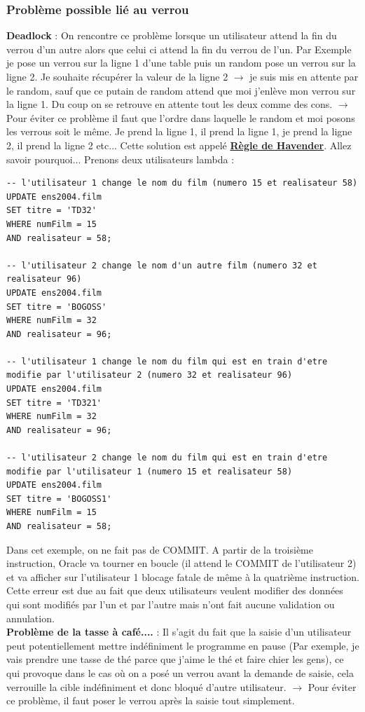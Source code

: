 \documentclass{report}
\begin{document}
\subsubsection{Problème possible lié au verrou}
\textbf{Deadlock} : On rencontre ce problème lorsque un utilisateur attend la fin du verrou d'un autre alors que celui ci attend la fin du verrou de l'un. 
\newline Par Exemple je pose un verrou sur la ligne 1 d'une table puis un random pose un verrou sur la ligne 2. Je souhaite récupérer la valeur de la ligne 2 $\rightarrow$ je suis mis en attente par le random, sauf que ce putain de random attend que moi j'enlève mon verrou sur la ligne 1. Du coup on se retrouve en attente tout les deux comme des cons.
$\rightarrow$ Pour éviter ce problème il faut que l'ordre dans laquelle le random et moi posons les verrous soit le même. Je prend la ligne 1, il prend la ligne 1, je prend la ligne 2, il prend la ligne 2 etc... Cette solution est appelé \textbf{\underline{Règle de Havender}}. Allez savoir pourquoi...
\newline
Prenons deux utilisateurs lambda :
\begin{lstlisting}[style=MySQLStyle]
-- l'utilisateur 1 change le nom du film (numero 15 et realisateur 58)
UPDATE ens2004.film
SET titre = 'TD32'
WHERE numFilm = 15
AND realisateur = 58;

-- l'utilisateur 2 change le nom d'un autre film (numero 32 et realisateur 96)
UPDATE ens2004.film
SET titre = 'BOGOSS'
WHERE numFilm = 32
AND realisateur = 96;

-- l'utilisateur 1 change le nom du film qui est en train d'etre modifie par l'utilisateur 2 (numero 32 et realisateur 96)
UPDATE ens2004.film
SET titre = 'TD321'
WHERE numFilm = 32
AND realisateur = 96;

-- l'utilisateur 2 change le nom du film qui est en train d'etre modifie par l'utilisateur 1 (numero 15 et realisateur 58)
UPDATE ens2004.film
SET titre = 'BOGOSS1'
WHERE numFilm = 15
AND realisateur = 58;
\end{lstlisting}

Dans cet exemple, on ne fait pas de COMMIT. A partir de la troisième instruction, Oracle va tourner en boucle (il attend le COMMIT de l'utilisateur 2) et va afficher sur l'utilisateur 1 blocage fatale de même à la quatrième instruction.
Cette erreur est due au fait que deux utilisateurs veulent modifier des données qui sont modifiés par l'un et par l'autre mais n'ont fait aucune validation ou annulation.\\
\textbf{Problème de la tasse à café....} : Il s'agit du fait que la saisie d'un utilisateur peut potentiellement mettre indéfiniment le programme en pause (Par exemple, je vais prendre une tasse de thé parce que j'aime le thé et faire chier les gens), ce qui provoque dans le cas où on a posé un verrou avant la demande de saisie, cela verrouille la cible indéfiniment et donc bloqué d'autre utilisateur.
$\rightarrow$ Pour éviter ce problème, il faut poser le verrou après la saisie tout simplement. 
\end{document}
